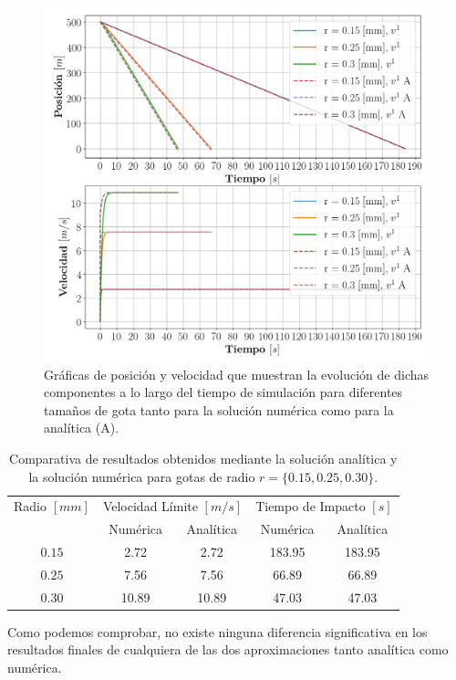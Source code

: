 \documentclass[journal]{IEEEtran}
\begin{document}
\begin{figure}[!htb]
	\centering
	\includegraphics[width=\linewidth]{graficas_analitica}
  \caption{Gráficas de posición y velocidad que muestran la evolución de dichas componentes a lo largo del tiempo de simulación para diferentes tamaños de gota tanto para la solución numérica como para la analítica (A).}
  \label{fig:analitica}
\end{figure}

\begin{table}[!htb]
	\begin{tabular}{ccccc}
    Radio $[mm]$ & \multicolumn{2}{c}{Velocidad Límite $[m/s]$} & \multicolumn{2}{c}{Tiempo de Impacto $[s]$}\\
    & Numérica & Analítica & Numérica & Analítica\\
		\hline
    $0.15$ & 2.72 & 2.72 & 183.95 & 183.95 \\
    $0.25$ & 7.56 & 7.56 & 66.89 & 66.89 \\
    $0.30$ & 10.89 & 10.89 & 47.03 & 47.03 \\
	\end{tabular}
  \caption{Comparativa de resultados obtenidos mediante la solución analítica y la solución numérica para gotas de radio $r=\{0.15, 0.25, 0.30\}$.}
  \label{table:analitica}
\end{table}

Como podemos comprobar, no existe ninguna diferencia significativa en los resultados finales de cualquiera de las dos aproximaciones tanto analítica como numérica.
\end{document}
